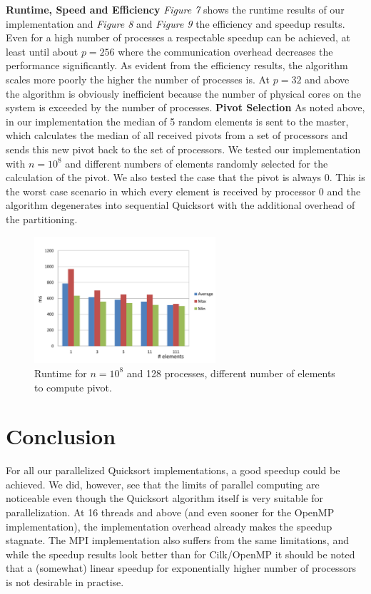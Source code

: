 \documentclass[12pt,a4paper]{article}
\begin{document}
\noindent\textbf{Runtime, Speed and Efficiency}\newline
\emph{Figure 7} shows the runtime results of our implementation and \emph{Figure 8} and \emph{Figure 9} the efficiency and speedup results. Even for a high number of processes a respectable speedup can be achieved, at least until about $p=256$ where the communication overhead decreases the performance significantly. As evident from the efficiency results, the algorithm scales more poorly the higher the number of processes is. At $p=32$ and above the algorithm is obviously inefficient because the number of physical cores on the system is exceeded by the number of processes.
\newline\newline
\textbf{Pivot Selection}\newline
As noted above, in our implementation the median of 5 random elements is sent to the master, which calculates the median of all received pivots from a set of processors and sends this new pivot back to the set of processors. We tested our implementation with $n=10^{8}$ and different numbers of elements randomly selected for the calculation of the pivot. We also tested the case that the pivot is always 0. This is the worst case scenario in which every element is received by processor 0 and the algorithm degenerates into sequential Quicksort with the additional overhead of the partitioning.
\begin{figure}[h]
	\includegraphics[width=0.6\textwidth]{img/mpi_pivot.pdf}
	\caption{Runtime for $n=10^{8}$ and 128 processes, different number of elements to compute pivot.}
\end{figure}
\newline\newline

\section{Conclusion}

For all our parallelized Quicksort implementations, a good speedup could be achieved. We did, however, see that the limits of parallel computing are noticeable even though the Quicksort algorithm itself is very suitable for parallelization. At 16 threads and above (and even sooner for the OpenMP implementation), the implementation overhead already makes the speedup stagnate. The MPI implementation also suffers from the same limitations, and while the speedup results look better than for Cilk/OpenMP it should be noted that a (somewhat) linear speedup for exponentially higher number of processors is not desirable in practise.
\end{document}
